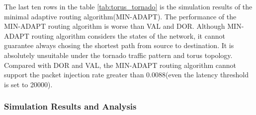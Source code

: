 The last ten rows in the table \ref{tab:torus_tornado} is the simulation results of the minimal adaptive routing algorithm(MIN-ADAPT). The performance of the MIN-ADAPT routing algorithm is worse than VAL and DOR. Although MIN-ADAPT routing algorithm considers the states of the network, it cannot guarantee always chosing the shortest path from source to destination. It is absolutely unsuitable under the tornado traffic pattern and torus topology. Compared with DOR and VAL, the MIN-ADAPT routing algorithm cannot support the packet injection rate greater than 0.0088(even the latency threshold is set to 20000).



\subsubsection{Simulation Results and Analysis}
\label{sec:torus_tornado_results}
